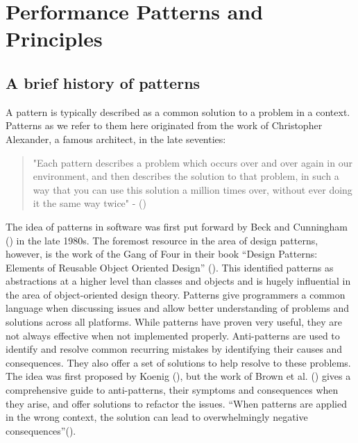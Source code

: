 \documentclass[a4paper,11pt,article,oneside]{memoir}
\begin{document}
	\newpage
	\chapter{Performance Patterns and Principles}
	\section{A brief history of patterns}
	
	
	A pattern is typically described as a common solution to a problem in a context. Patterns as we refer to them here originated from the work of Christopher Alexander, a famous architect, in the late seventies:
	\begin{quotation}
		"Each pattern describes a problem which occurs over and over again in our environment,
		and then describes the solution to that problem, in such a way that you can use this solution
		a million times over, without ever doing it the same way twice" - (\cite{alexander1977pattern})
	\end{quotation}
	The idea of patterns in software was first put forward by Beck and Cunningham (\cite{beck1999kent}) in the late 1980s. The foremost resource in the area of design patterns, however, is the work of the Gang of Four in their book “Design Patterns: Elements of Reusable Object Oriented Design” (\cite{gamma1993design}). This identified patterns as abstractions at a higher level than classes and objects and is hugely influential in the area of object-oriented design theory. Patterns give programmers a common language when discussing issues and allow better understanding of problems and solutions across all platforms. While patterns have proven very useful, they are not always effective when not implemented properly. Anti-patterns are used to identify and resolve common recurring mistakes by identifying their causes and consequences. They also offer a set of solutions to help resolve to these problems. The idea was first proposed by Koenig (\cite{koenig1998patterns}), but the work of Brown et al. (\cite{brown1998antipatterns}) gives a comprehensive guide to anti-patterns, their symptoms and consequences when they arise, and offer solutions to refactor the issues. “When patterns are applied in the wrong context, the solution can lead to overwhelmingly negative consequences”(\cite{brown1998antipatterns}). 
\end{document}
